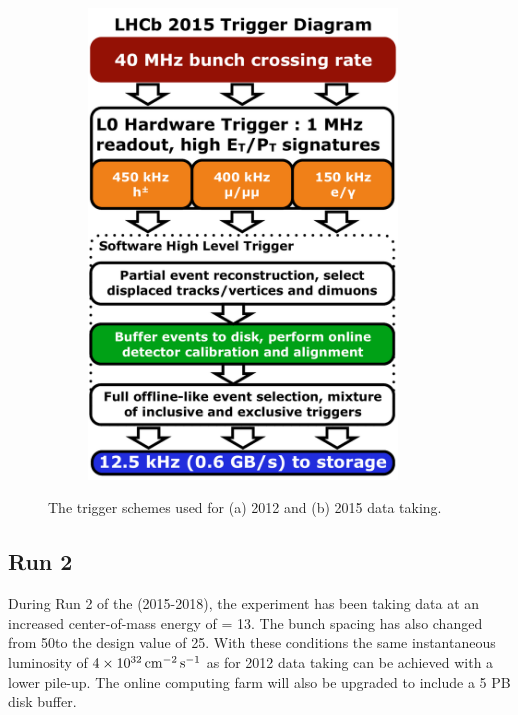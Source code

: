 \begin{figure}[!tb]
\begin{subfigure}{0.49\textwidth}
\includegraphics[width=0.9\textwidth]{figs/detector/trigger-run2.pdf}
\caption{}
\label{fig:trigger:run2}
\end{subfigure}
\caption{The trigger schemes used for (a) 2012 and (b) 2015 data taking.}
\label{fig:trigger}
\end{figure}

\subsection{\lhcb Run 2}
\label{sec:lhcb:lhcb-run2}

During Run 2 of the \lhc (2015-2018), the \lhcb experiment has been taking data at an increased center-of-mass energy of \sqs = 13\tev. The bunch spacing has also changed from 50\ns to the design value of 25\ns. With these conditions the same instantaneous luminosity of $4\times10^{32}\mathrm{ \,cm}^{-2}\mathrm{{\,s}}^{-1}$ as for 2012 data taking can be achieved with a lower pile-up. The online computing farm will also be upgraded to include a 5 PB disk buffer. 

